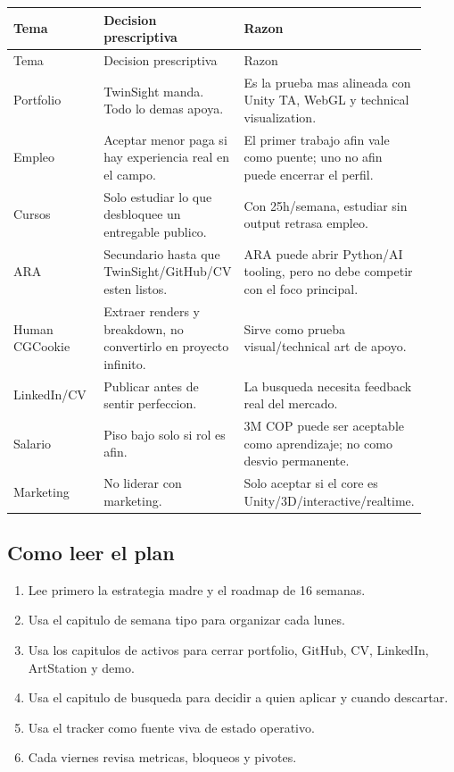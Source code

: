 \begin{center}
\scriptsize
\begin{longtable}{>{\raggedright\arraybackslash}p{0.305\linewidth} >{\raggedright\arraybackslash}p{0.305\linewidth} >{\raggedright\arraybackslash}p{0.305\linewidth}}
\toprule
Tema & Decision prescriptiva & Razon \\
\midrule
\endfirsthead
\toprule
Tema & Decision prescriptiva & Razon \\
\midrule
\endhead
Portfolio & TwinSight manda. Todo lo demas apoya. & Es la prueba mas alineada con Unity TA, WebGL y technical visualization. \\
Empleo & Aceptar menor paga si hay experiencia real en el campo. & El primer trabajo afin vale como puente; uno no afin puede encerrar el perfil. \\
Cursos & Solo estudiar lo que desbloquee un entregable publico. & Con 25h/semana, estudiar sin output retrasa empleo. \\
ARA & Secundario hasta que TwinSight/GitHub/CV esten listos. & ARA puede abrir Python/AI tooling, pero no debe competir con el foco principal. \\
Human CGCookie & Extraer renders y breakdown, no convertirlo en proyecto infinito. & Sirve como prueba visual/technical art de apoyo. \\
LinkedIn/CV & Publicar antes de sentir perfeccion. & La busqueda necesita feedback real del mercado. \\
Salario & Piso bajo solo si rol es afin. & 3M COP puede ser aceptable como aprendizaje; no como desvio permanente. \\
Marketing & No liderar con marketing. & Solo aceptar si el core es Unity/3D/interactive/realtime. \\
\bottomrule
\end{longtable}
\end{center}



\subsection{Como leer el plan}


\begin{enumerate}
\item Lee primero la estrategia madre y el roadmap de 16 semanas.
\item Usa el capitulo de semana tipo para organizar cada lunes.
\item Usa los capitulos de activos para cerrar portfolio, GitHub, CV, LinkedIn, ArtStation y demo.
\item Usa el capitulo de busqueda para decidir a quien aplicar y cuando descartar.
\item Usa el tracker como fuente viva de estado operativo.
\item Cada viernes revisa metricas, bloqueos y pivotes.
\end{enumerate}


